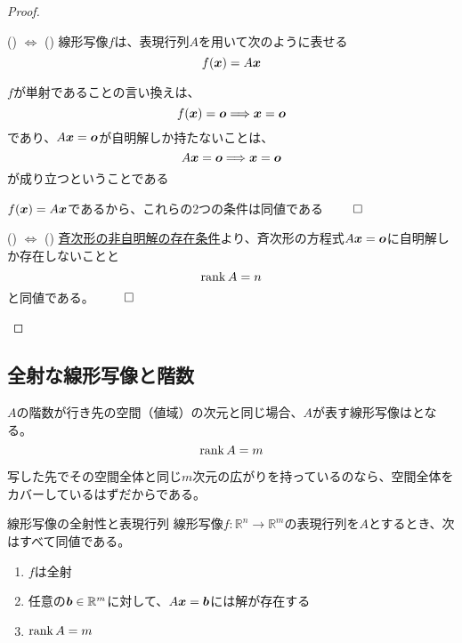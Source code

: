 \documentclass[../../../topic_linear-algebra]{subfiles}
\begin{document}
\begin{proof}
  \begin{subpattern}{() $\Longleftrightarrow$ ()}
    線形写像$f$は、表現行列$A$を用いて次のように表せる
    \begin{equation*}
      f(\vb*{x}) = A\vb*{x}
    \end{equation*}

    $f$が単射であることの言い換えは、
    \begin{equation*}
      f(\vb*{x}) = \vb*{o} \Longrightarrow \vb*{x} = \vb*{o}
    \end{equation*}
    であり、$A\vb*{x} = \vb*{o}$が自明解しか持たないことは、
    \begin{equation*}
      A\vb*{x} = \vb*{o} \Longrightarrow \vb*{x} = \vb*{o}
    \end{equation*}
    が成り立つということである

    $f(\vb*{x}) = A\vb*{x}$であるから、これらの2つの条件は同値である $\qed$
  \end{subpattern}

  \begin{subpattern}{() $\Longleftrightarrow$ ()}
    \hyperref[thm:homogeneous-trivial-iff-full-col-rank]{斉次形の非自明解の存在条件}より、斉次形の方程式$A\vb*{x} = \vb*{o}$に自明解しか存在しないことと
    \begin{equation*}
      \rank A = n
    \end{equation*}
    と同値である。 $\qed$
  \end{subpattern}
\end{proof}

\subsection{全射な線形写像と階数}

$A$の階数が行き先の空間（値域）の次元と同じ場合、$A$が表す線形写像はとなる。
\begin{equation*}
  \rank A = m
\end{equation*}

写した先でその空間全体と同じ$m$次元の広がりを持っているのなら、空間全体をカバーしているはずだからである。

\begin{theorem}{線形写像の全射性と表現行列}
  線形写像$f\colon \mathbb{R}^n \to \mathbb{R}^m$の表現行列を$A$とするとき、次はすべて同値である。
  \begin{enumerate}[label=\romanlabel]
    \item $f$は全射
    \item 任意の$\vb*{b} \in \mathbb{R}^m$に対して、$A\vb*{x} = \vb*{b}$には解が存在する
    \item $\rank A = m$
  \end{enumerate}
\end{theorem}
\end{document}
